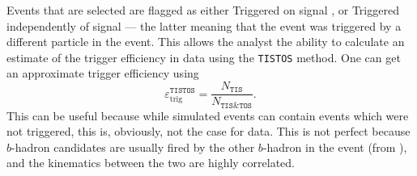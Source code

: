 Events that are selected are flagged as either
Triggered on signal \tos, or
Triggered independently of signal \tis --- the latter meaning that the event was triggered by
a different particle in the event.
This allows the analyst the ability to calculate an estimate of the trigger efficiency in data
using the {\tt TISTOS} method.
One can get an approximate trigger efficiency using
\begin{equation}
  \varepsilon_\mathrm{trig}^\mathtt{TISTOS} =
  \frac{N_\mathtt{TIS}}{N_\mathtt{TIS\&TOS}}.
\end{equation}
This can be useful because while simulated events can contain events which were not triggered, this
is, obviously, not the case for data.
This is not perfect because \tis $b$-hadron candidates are usually fired by the other $b$-hadron
in the event (from ), and the kinematics between the two are highly correlated.



